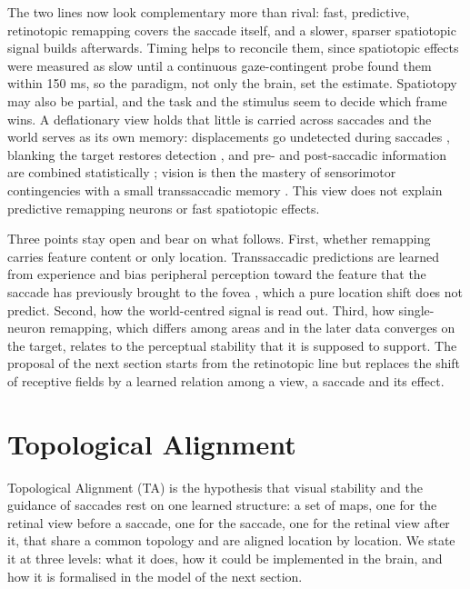 \documentclass[14pt]{article}
\begin{document}
The two lines now look complementary more than rival: fast, predictive, retinotopic remapping covers the saccade itself, and a slower, sparser spatiotopic signal builds afterwards.
Timing helps to reconcile them, since spatiotopic effects were measured as slow until a continuous gaze-contingent probe found them within 150 ms, so the paradigm, not only the brain, set the estimate.
Spatiotopy may also be partial, and the task and the stimulus seem to decide which frame wins.
A deflationary view holds that little is carried across saccades and the world serves as its own memory: displacements go undetected during saccades \citep{bridgemanFailureDetectDisplacement1975}, blanking the target restores detection \citep{deubelPostsaccadicTargetBlanking1996}, and pre- and post-saccadic information are combined statistically \citep{niemeierOptimalTranssaccadicIntegration2003}; vision is then the mastery of sensorimotor contingencies \citep{oreganSensorimotorAccountVision2001} with a small transsaccadic memory \citep{irwinInformationIntegrationSaccadic1991}.
This view does not explain predictive remapping neurons or fast spatiotopic effects.

Three points stay open and bear on what follows.
First, whether remapping carries feature content or only location.
Transsaccadic predictions are learned from experience and bias peripheral perception toward the feature that the saccade has previously brought to the fovea \citep{herwigWhenCirclesBecome2015}, which a pure location shift does not predict.
Second, how the world-centred signal is read out.
Third, how single-neuron remapping, which differs among areas and in the later data converges on the target, relates to the perceptual stability that it is supposed to support.
The proposal of the next section starts from the retinotopic line but replaces the shift of receptive fields by a learned relation among a view, a saccade and its effect.

\section{Topological Alignment}
\label{sec:ta}

Topological Alignment (TA) is the hypothesis that visual stability and the guidance of saccades rest on one learned structure: a set of maps, one for the retinal view before a saccade, one for the saccade, one for the retinal view after it, that share a common topology and are aligned location by location.
We state it at three levels: what it does, how it could be implemented in the brain, and how it is formalised in the model of the next section.
\end{document}
